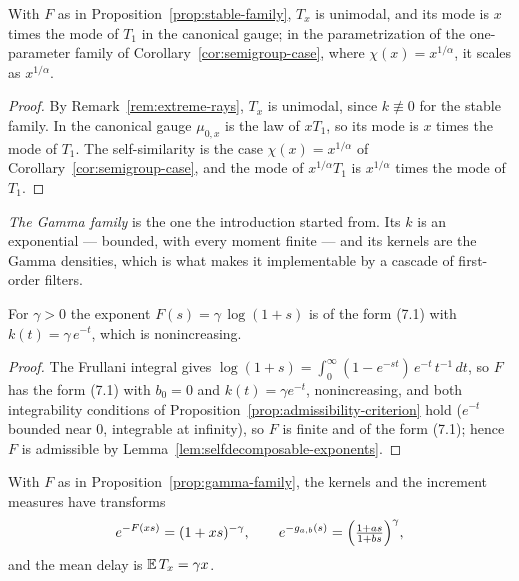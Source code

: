 \begin{proposition}\label{prop:stable-mode}
With $F$ as in Proposition~\ref{prop:stable-family}, $T_x$ is unimodal, and its mode is $x$ times
the mode of $T_1$ in the canonical gauge; in the parametrization of the one-parameter family of
Corollary~\ref{cor:semigroup-case}, where $\chi(x) = x^{1/\alpha}$, it scales as $x^{1/\alpha}$.
\end{proposition}

\begin{proof}
By Remark~\ref{rem:extreme-rays}, $T_x$ is unimodal, since $k \not\equiv 0$ for the stable family.
In the canonical gauge $\mu_{0,x}$ is the law of $xT_1$, so its mode is $x$ times the mode of
$T_1$. The self-similarity is the case $\chi(x) = x^{1/\alpha}$ of Corollary~\ref{cor:semigroup-case},
and the mode of $x^{1/\alpha}T_1$ is $x^{1/\alpha}$ times the mode of $T_1$.
\end{proof}

\emph{The Gamma family} is the one the introduction started from. Its $k$ is an exponential
--- bounded, with every moment finite --- and its kernels are the Gamma densities, which is
what makes it implementable by a cascade of first-order filters.

\begin{proposition}\label{prop:gamma-family}
For $\gamma > 0$ the exponent $F(s) = \gamma\,\log(1 + s)$ is of the form (7.1) with
$k(t) = \gamma\, e^{-t}$, which is nonincreasing.
\end{proposition}

\begin{proof}
The Frullani integral gives
$\log(1+s) = \int_0^\infty (1 - e^{-st})\,e^{-t}\,t^{-1}\,dt$, so $F$ has the form (7.1) with
$b_0 = 0$ and $k(t) = \gamma e^{-t}$, nonincreasing, and both integrability conditions of
Proposition~\ref{prop:admissibility-criterion} hold ($e^{-t}$ bounded near $0$, integrable at
infinity), so $F$ is finite and of the form (7.1); hence $F$ is admissible by
Lemma~\ref{lem:selfdecomposable-exponents}.
\end{proof}

\begin{proposition}\label{prop:gamma-kernels}
With $F$ as in Proposition~\ref{prop:gamma-family}, the kernels and the increment measures have
transforms
\[
  e^{-F(xs)} = (1 + x s)^{-\gamma}, \qquad
  e^{-g_{a,b}(s)} = \Bigl(\tfrac{1 + as}{1 + bs}\Bigr)^{\gamma},
\]
and the mean delay is $\mathbb{E}\,T_x = \gamma x$.
\end{proposition}

